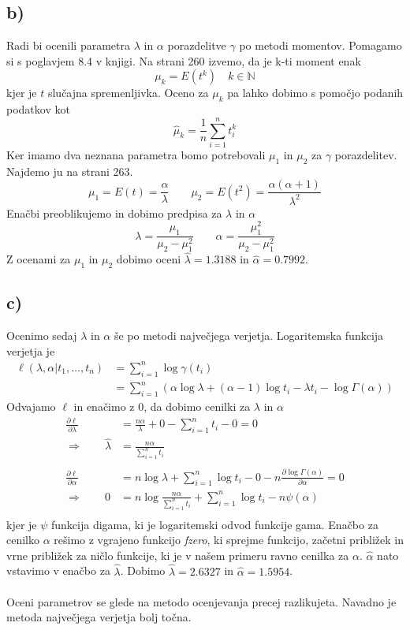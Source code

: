 \documentclass[A4paper, 11pt]{article}
\begin{document}
\subsection*{b)}
Radi bi ocenili parametra $\lambda$ in $\alpha$  porazdelitve $\gamma$ po metodi momentov. Pomagamo si s poglavjem 8.4 v knjigi. Na strani 260 izvemo, da je k-ti moment enak
\[ \mu_k = E(t^k) \quad k \in \mathbb{N} \]
kjer je $t$ slučajna spremenljivka. Oceno za $\mu_k$ pa lahko dobimo s pomočjo podanih podatkov kot
\[ \hat{\mu}_k = \frac{1}{n} \sum_{i=1}^{n} t_i^k \]
Ker imamo dva neznana parametra bomo potrebovali $\mu_1$ in $\mu_2$ za $\gamma$ porazdelitev. Najdemo ju na strani 263.
\[ \mu_1 = E(t) = \frac{\alpha}{\lambda} \qquad \mu_2 = E(t^2) = \frac{\alpha (\alpha + 1)}{\lambda^2} \]
Enačbi preoblikujemo in dobimo predpisa za $\lambda$ in $\alpha$
\[ \lambda = \frac{\mu_1}{\mu_2 - \mu_1^2} \qquad \alpha = \frac{\mu_1^2}{\mu_2 - \mu_1^2} \]
Z ocenami za $\mu_1$ in $\mu_2$ dobimo oceni $\hat{\lambda} = 1.3188$ in $\hat{\alpha} = 0.7992$. 

\subsection*{c)}
Ocenimo sedaj  $\lambda$ in $\alpha$ še po metodi največjega verjetja. Logaritemska funkcija verjetja je 
\[
\begin{split}
\ell (\lambda, \alpha | t_1, \ldots, t_n) & = \sum_{i=1}^{n} \log{\gamma(t_i)} \\
                                                              & = \sum_{i=1}^{n} (\alpha \log{\lambda} + (\alpha - 1) \log{t_i} - \lambda t_i - \log{\Gamma (\alpha)})
\end{split}
\]
Odvajamo $\ell$ in enačimo z 0, da dobimo cenilki za $\lambda$ in $\alpha$
\[
\begin{split}
\frac{\partial \ell}{\partial \lambda} & = \frac{n \alpha}{\lambda} + 0 - \sum_{i=1}^{n} t_i - 0 = 0 \\
\Rightarrow \qquad \hat{\lambda} & = \frac{n \alpha}{\sum_{i=1}^{n} t_i} \\
\\
\frac{\partial \ell}{\partial \alpha} & = n \log{\lambda} + \sum_{i=1}^{n} \log{t_i} - 0 - n \frac{\partial \log{\Gamma (\alpha)}}{\partial \alpha} = 0 \\
\Rightarrow \qquad 0 & =  n \log{\frac{n \alpha}{\sum_{i=1}^{n} t_i}} + \sum_{i=1}^{n} \log{t_i} - n \psi(\alpha) \\
\end{split}
\]
kjer je $\psi$ funkcija digama, ki je logaritemski odvod funkcije gama. Enačbo za cenilko $\alpha$ rešimo z vgrajeno funkcijo \textit{fzero}, ki sprejme funkcijo, začetni približek in vrne približek za ničlo funkcije, ki je v našem primeru ravno cenilka za $\alpha$. $\hat{\alpha}$ nato vstavimo v enačbo za $\hat{\lambda}$. Dobimo $\hat{\lambda} = 2.6327$ in $\hat{\alpha} = 1.5954$. \\
\\
Oceni parametrov se glede na metodo ocenjevanja precej razlikujeta. Navadno je metoda največjega verjetja bolj točna.
\end{document}
